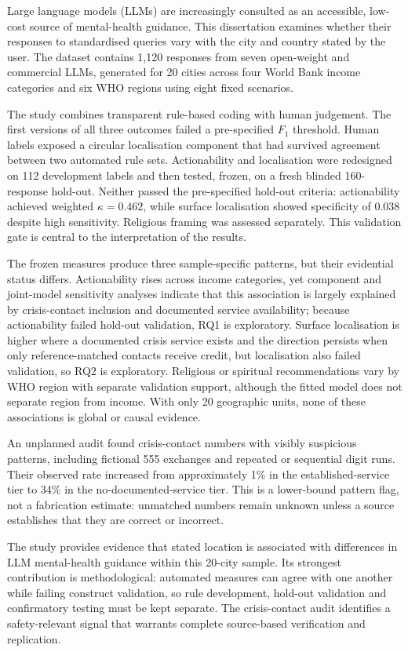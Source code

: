 Large language models (LLMs) are increasingly consulted as an accessible, low-cost source of mental-health guidance. This dissertation examines whether their responses to standardised queries vary with the city and country stated by the user. The dataset contains 1{,}120 responses from seven open-weight and commercial LLMs, generated for 20 cities across four World Bank income categories and six WHO regions using eight fixed scenarios.

The study combines transparent rule-based coding with human judgement. The first versions of all three outcomes failed a pre-specified $F_1$ threshold. Human labels exposed a circular localisation component that had survived agreement between two automated rule sets. Actionability and localisation were redesigned on 112 development labels and then tested, frozen, on a fresh blinded 160-response hold-out. Neither passed the pre-specified hold-out criteria: actionability achieved weighted $\kappa=0.462$, while surface localisation showed specificity of 0.038 despite high sensitivity. Religious framing was assessed separately. This validation gate is central to the interpretation of the results.

The frozen measures produce three sample-specific patterns, but their evidential status differs. Actionability rises across income categories, yet component and joint-model sensitivity analyses indicate that this association is largely explained by crisis-contact inclusion and documented service availability; because actionability failed hold-out validation, RQ1 is exploratory. Surface localisation is higher where a documented crisis service exists and the direction persists when only reference-matched contacts receive credit, but localisation also failed validation, so RQ2 is exploratory. Religious or spiritual recommendations vary by WHO region with separate validation support, although the fitted model does not separate region from income. With only 20 geographic units, none of these associations is global or causal evidence.

An unplanned audit found crisis-contact numbers with visibly suspicious patterns, including fictional 555 exchanges and repeated or sequential digit runs. Their observed rate increased from approximately 1\% in the established-service tier to 34\% in the no-documented-service tier. This is a lower-bound pattern flag, not a fabrication estimate: unmatched numbers remain unknown unless a source establishes that they are correct or incorrect.

The study provides evidence that stated location is associated with differences in LLM mental-health guidance within this 20-city sample. Its strongest contribution is methodological: automated measures can agree with one another while failing construct validation, so rule development, hold-out validation and confirmatory testing must be kept separate. The crisis-contact audit identifies a safety-relevant signal that warrants complete source-based verification and replication.
